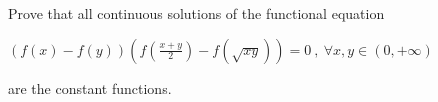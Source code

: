 Prove that all continuous solutions of the functional equation

$\left(f(x)-f(y)\right)\left(f\left(\frac{x+y}{2}\right)-f\left(\sqrt{xy}\right)\right)=0 \ , \ \forall x,y\in (0,+\infty)$

are the constant functions.